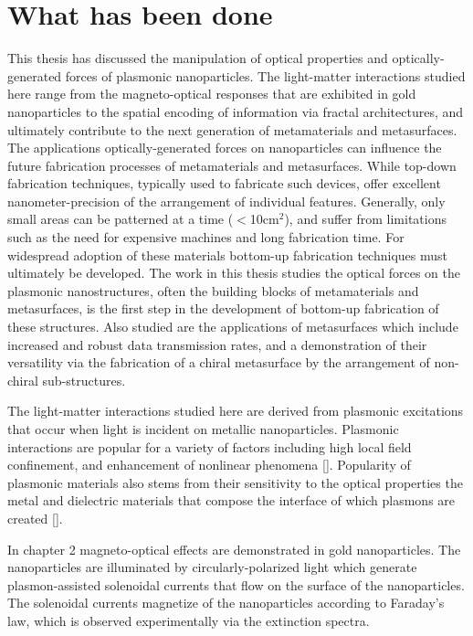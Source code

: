\section{What has been done}
This thesis has discussed the manipulation of optical properties and optically-generated forces of plasmonic nanoparticles. The light-matter interactions studied here range from the magneto-optical responses that are exhibited in gold nanoparticles to the spatial encoding of information via fractal architectures, and ultimately contribute to the next generation of metamaterials and metasurfaces. The applications optically-generated forces on nanoparticles can influence the future fabrication processes of metamaterials and metasurfaces. While top-down fabrication techniques, typically used to fabricate such devices, offer excellent nanometer-precision of the arrangement of individual features. Generally, only small areas can be patterned at a time ($<$10cm$^2$), and suffer from limitations such as the need for expensive machines and long fabrication time. For widespread adoption of these materials bottom-up fabrication techniques must ultimately be developed. The work in this thesis studies the optical forces on the plasmonic nanostructures, often the building blocks of metamaterials and metasurfaces, is the first step in the development of bottom-up fabrication of these structures. Also studied are the applications of metasurfaces which include increased and robust data transmission rates, and a demonstration of their versatility via the fabrication of a chiral metasurface by the arrangement of non-chiral sub-structures.

The light-matter interactions studied here are derived from plasmonic excitations that occur when light is incident on metallic nanoparticles. Plasmonic interactions are popular for a variety of factors including high local field confinement, and enhancement of nonlinear phenomena [\cite{Novotny2011, Kauranen}]. Popularity of plasmonic materials also stems from their sensitivity to the optical properties the metal and dielectric materials that compose the interface of which plasmons are created [\cite{Homola}].

In chapter 2 magneto-optical effects are demonstrated in gold nanoparticles. The nanoparticles are illuminated by circularly-polarized light which generate plasmon-assisted solenoidal currents that flow on the surface of the nanoparticles. The solenoidal currents magnetize of the nanoparticles according to Faraday's law, which is observed experimentally via the extinction spectra.

